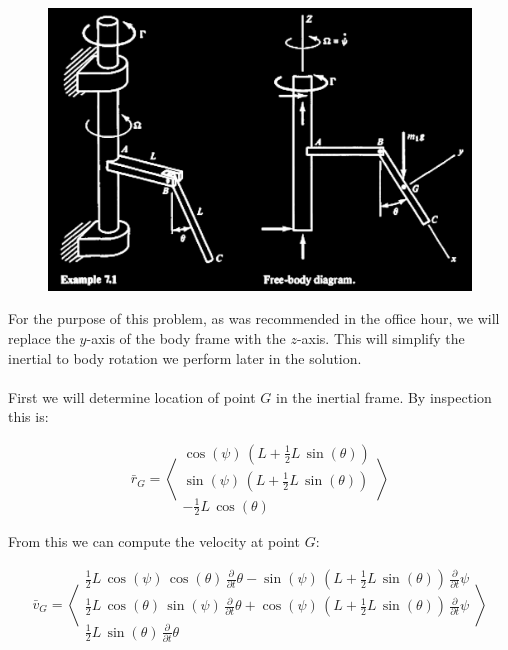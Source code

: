 \documentclass[12pt, letterpaper]{../assignment}
\begin{document}
\begin{figure}[H]
    \centering
    \includegraphics[scale=0.5,frame]{images/Problem_2.png}
\end{figure}


For the purpose of this problem,
as was recommended in the office hour,
we will replace the $y$-axis of the body frame with the $z$-axis.
This will simplify the inertial to body rotation we perform later in the solution.
\\\\
First we will determine location of point $G$ in the inertial frame.
By inspection this is:

$$ \bar{r}_G = \left<\begin{array}{c}
\cos \left(\psi \right)\,{\left(L+\frac{1}{2}L\,\sin \left(\theta \right)\right)}\\
\sin \left(\psi \right)\,{\left(L+\frac{1}{2}L\,\sin \left(\theta \right)\right)}\\
-\frac{1}{2}L\,\cos \left(\theta \right)
\end{array}\right> $$

From this we can compute the velocity at point $G$:

$$ \bar{v}_G = \left<\begin{array}{c}
  \frac{1}{2}L\,\cos\left(\psi \right)\,\cos\left(\theta \right)\,\frac{\partial }{\partial t} \theta -\sin\left(\psi \right)\,\left(L+\frac{1}{2}L\,\sin\left(\theta \right)\right)\,\frac{\partial }{\partial t} \psi \\
  \frac{1}{2}L\,\cos\left(\theta \right)\,\sin\left(\psi \right)\,\frac{\partial }{\partial t} \theta +\cos\left(\psi \right)\,\left(L+\frac{1}{2}L\,\sin\left(\theta \right)\right)\,\frac{\partial }{\partial t} \psi \\
  \frac{1}{2}L\,\sin\left(\theta \right)\,\frac{\partial }{\partial t} \theta  \end{array}\right>$$
\end{document}
